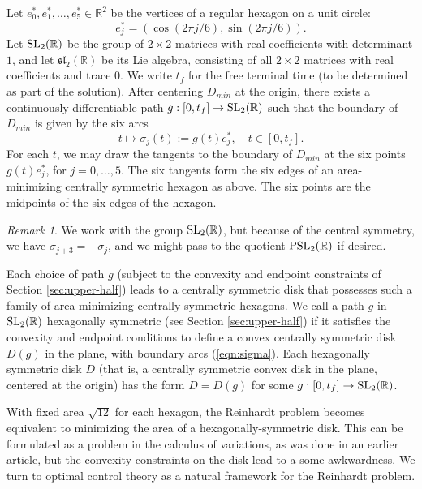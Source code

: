 \documentclass{article}
\theoremstyle{remark}
\newtheorem{remark}[equation]{Remark}%
\newcommand{\ring}[1]{\mathbb{#1}}
\newcommand{\op}[1]{\hbox{#1}}
\def\sl{\mathfrak{sl}_2(\ring{R})}
\def\SL{\op{SL}_2(\ring{R})}
\def\DR{D_{min}}
\newcommand\ee[1]{e_{#1}^*}
\begin{document}
Let $\ee{0},\ee{1},\ldots,\ee{5}\in\ring{R}^2$ be the vertices of a
regular hexagon on  a unit circle:
\[
\ee{j} = (\cos(2\pi j/6),\sin(2\pi j/6)).
\]
Let $\SL$ be the group of $2\times 2$ matrices with real coefficients
with determinant $1$, and let $\sl$ be its Lie algebra, consisting of
all $2\times 2$ matrices with real coefficients and trace $0$.  We
write $t_f$ for the free terminal time (to be determined as part of
the solution).  After centering $\DR$ at the origin, there exists a
continuously differentiable path $g:[0,t_f]\to \SL$ such that the
boundary of $\DR$ is given by the six arcs
\begin{equation}\label{eqn:sigma}
t\mapsto \sigma_j(t):= g(t) \ee{j}, \quad t \in [0,t_f].
\end{equation}
For each $t$, we may draw the tangents to the boundary of $\DR$ at the
six points $g(t) \ee{j}$, for $ j=0,\ldots,5$.  The six tangents form
the six edges of an area-minimizing centrally symmetric hexagon as
above.  The six points are the midpoints of the six edges of the
hexagon.

\begin{remark} We work with the group $\SL$, but because of the
  central symmetry, we have $\sigma_{j+3}=-\sigma_j$, and we might pass to the
  quotient $\op{PSL}_2(\ring{R})$ if desired.
\end{remark}

Each choice of path $g$ (subject to the convexity and endpoint
constraints of Section \ref{sec:upper-half}) leads to a centrally
symmetric disk that possesses such a family of area-minimizing
centrally symmetric hexagons.  We call a path $g$ in $\SL$ hexagonally
symmetric (see Section \ref{sec:upper-half}) if it satisfies the
convexity and endpoint conditions to define a convex centrally
symmetric disk $D(g)$ in the plane, with boundary arcs
(\ref{eqn:sigma}).  Each hexagonally symmetric disk $D$ (that is, a
centrally symmetric convex disk in the plane, centered at the origin)
has the form $D=D(g)$ for some $g:[0,t_f]\to\SL$.

With fixed area $\sqrt{12}$ for each hexagon, the Reinhardt problem
becomes equivalent to minimizing the area of a hexagonally-symmetric disk.  This
can be formulated as a problem in the calculus of variations, as was
done in an earlier article, but the convexity constraints on the disk
lead to a some awkwardness.  We turn to optimal control theory as a
natural framework for the Reinhardt problem.
\end{document}
